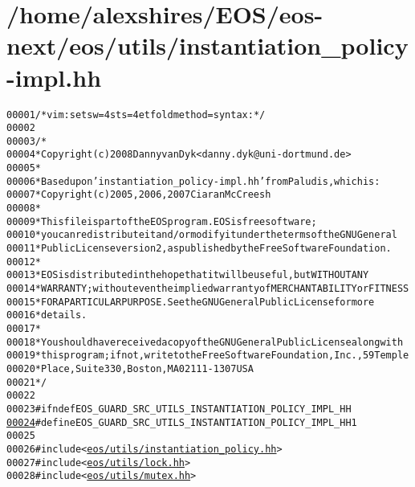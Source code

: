 \hypertarget{instantiation__policy-impl_8hh_source}{
\section{/home/alexshires/EOS/eos-\/next/eos/utils/instantiation\_\-policy-\/impl.hh}
}


\begin{footnotesize}\begin{alltt}
00001 \textcolor{comment}{/* vim: set sw=4 sts=4 et foldmethod=syntax : */}
00002 
00003 \textcolor{comment}{/*}
00004 \textcolor{comment}{ * Copyright (c) 2008 Danny van Dyk <danny.dyk@uni-dortmund.de>}
00005 \textcolor{comment}{ *}
00006 \textcolor{comment}{ * Based upon 'instantiation\_policy-impl.hh' from Paludis, which is:}
00007 \textcolor{comment}{ *     Copyright (c) 2005, 2006, 2007 Ciaran McCreesh}
00008 \textcolor{comment}{ *}
00009 \textcolor{comment}{ * This file is part of the EOS program. EOS is free software;}
00010 \textcolor{comment}{ * you can redistribute it and/or modify it under the terms of the GNU General}
00011 \textcolor{comment}{ * Public License version 2, as published by the Free Software Foundation.}
00012 \textcolor{comment}{ *}
00013 \textcolor{comment}{ * EOS is distributed in the hope that it will be useful, but WITHOUT ANY}
00014 \textcolor{comment}{ * WARRANTY; without even the implied warranty of MERCHANTABILITY or FITNESS}
00015 \textcolor{comment}{ * FOR A PARTICULAR PURPOSE.  See the GNU General Public License for more}
00016 \textcolor{comment}{ * details.}
00017 \textcolor{comment}{ *}
00018 \textcolor{comment}{ * You should have received a copy of the GNU General Public License along with}
00019 \textcolor{comment}{ * this program; if not, write to the Free Software Foundation, Inc., 59 Temple}
00020 \textcolor{comment}{ * Place, Suite 330, Boston, MA  02111-1307  USA}
00021 \textcolor{comment}{ */}
00022 
00023 \textcolor{preprocessor}{#ifndef EOS\_GUARD\_SRC\_UTILS\_INSTANTIATION\_POLICY\_IMPL\_HH}
\hypertarget{instantiation__policy-impl_8hh_source_l00024}{}\hyperlink{instantiation__policy-impl_8hh_ae2d6dcc9b4b13eb782bfb6b6763ef2d1}{00024} \textcolor{preprocessor}{}\textcolor{preprocessor}{#define EOS\_GUARD\_SRC\_UTILS\_INSTANTIATION\_POLICY\_IMPL\_HH 1}
00025 \textcolor{preprocessor}{}
00026 \textcolor{preprocessor}{#include <\hyperlink{instantiation__policy_8hh}{eos/utils/instantiation_policy.hh}>}
00027 \textcolor{preprocessor}{#include <\hyperlink{lock_8hh}{eos/utils/lock.hh}>}
00028 \textcolor{preprocessor}{#include <\hyperlink{mutex_8hh}{eos/utils/mutex.hh}>}

\end{alltt}
\end{footnotesize}
